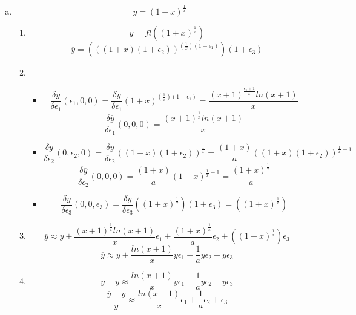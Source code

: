 \documentclass[12pt,a4paper]{article}
\begin{document}
\begin{enumerate}[(a)]
\item
\[
y= (1+x)^{\frac{1}{x}}
\]
\begin{enumerate}[1.]
\item
\[
\overline{y} = fl\left((1+x)^{\frac{1}{x}}\right)
\]
\[
\overline{y} = \left(((1+x)(1+\epsilon_2))^{\left(\frac{1}{x}\right)(1+\epsilon_1)}\right)(1+\epsilon_3)
\]
\item
\begin{itemize}
\item
\[
\frac{\delta\overline{y}}{\delta\epsilon_1}(\epsilon_1,0,0)
= \frac{\delta\overline{y}}{\delta\epsilon_1}
(1+x)^{\left(\frac{1}{x}\right)(1+\epsilon_1)}
= \frac{(x+1)^{\frac{\epsilon_1+1}{x}}ln(x+1)}{x}
\]
\[
\frac{\delta\overline{y}}{\delta\epsilon_1}(0,0,0)
= \frac{(x+1)^{\frac{1}{x}}ln(x+1)}{x}
\]
\item
\[
\frac{\delta\overline{y}}{\delta\epsilon_2}(0,\epsilon_2,0)
= \frac{\delta\overline{y}}{\delta\epsilon_2}
((1+x)(1+\epsilon_2))^{\frac{1}{x}}
= \frac{(1+x)}{a}((1+x)(1+\epsilon_2))^{\frac{1}{x}-1}
\]
\[
\frac{\delta\overline{y}}{\delta\epsilon_2}(0,0,0)
= \frac{(1+x)}{a}(1+x)^{\frac{1}{x}-1}
=\frac{(1+x)^{\frac{1}{x}}}{a}
\]
\item
\[
\frac{\delta\overline{y}}{\delta\epsilon_3}(0,0,\epsilon_3)
= \frac{\delta\overline{y}}{\delta\epsilon_3}
\left((1+x)^{\frac{1}{x}}\right)(1+\epsilon_3)
= \left((1+x)^{\frac{1}{x}}\right)
\]

\end{itemize}
\item
\[
\overline{y} \approx y +
\frac{(x+1)^{\frac{1}{x}}ln(x+1)}{x} \epsilon_1
+
\frac{(1+x)^{\frac{1}{x}}}{a}\epsilon_2
+
\left((1+x)^{\frac{1}{x}}\right) \epsilon_3
\]
\[
\overline{y} \approx y +
\frac{ln(x+1)}{x}y \epsilon_1
+ \frac{1}{a}y \epsilon_2
+ y \epsilon_3
\]
\item
\[
\overline{y} - y \approx 
\frac{ln(x+1)}{x}y \epsilon_1
+ \frac{1}{a}y \epsilon_2
+ y \epsilon_3
\]
\[
\frac{\overline{y}-y}{y} \approx 
\frac{ln(x+1)}{x} \epsilon_1
+ \frac{1}{a} \epsilon_2
+ \epsilon_3
\]
\end{enumerate}


\end{enumerate}
\end{document}
